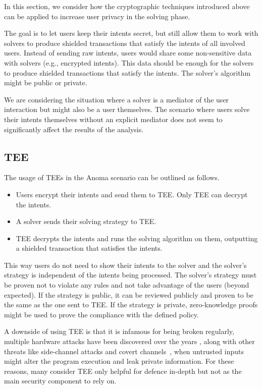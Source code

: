 \documentclass[
    9pt,            %
    report,        %
    affiltop,       %
]{art}
\begin{document}
In this section, we consider how the cryptographic techniques introduced above can be applied to increase user privacy in the solving phase.

The goal is to let users keep their intents secret, but still allow them to work with solvers to produce shielded transactions that satisfy the intents of all involved users. Instead of sending raw intents, users would share some non-sensitive data with solvers (e.g., encrypted intents). This data should be enough for the solvers to produce shielded transactions that satisfy the intents. The solver's algorithm might be public or private. 

We are considering the situation where a solver is a mediator of the user interaction but might also be a user themselves. The scenario where users solve their intents themselves without an explicit mediator does not seem to significantly affect the results of the analysis.

\subsection{TEE}\label{TEE-expanded}

The usage of TEEs in the Anoma scenario can be outlined as follows.

\begin{itemize}
    \item Users encrypt their intents and send them to TEE. Only TEE can decrypt the intents.
    \item A solver sends their solving strategy to TEE.
    \item TEE decrypts the intents and runs the solving algorithm on them, outputting a shielded transaction that satisfies the intents.
\end{itemize}

This way users do not need to show their intents to the solver and the solver's strategy is independent of the intents being processed. The solver's strategy must be proven not to violate any rules and not take advantage of the users (beyond expected). If the strategy is public, it can be reviewed publicly and proven to be the same as the one sent to TEE. If the strategy is private, zero-knowledge proofs might be used to prove the compliance with the defined policy.

A downside of using TEE is that it is infamous for being broken regularly,
multiple hardware attacks have been discovered over the years
\citep{sgxfail,downfall}, along with other threats like side-channel attacks and
covert channels~\citep{flash}, when untrusted inputs might alter the program
execution and leak private information. For these reasons, many consider TEE
only helpful for defence in-depth but not as the main security component to rely
on.
\end{document}
